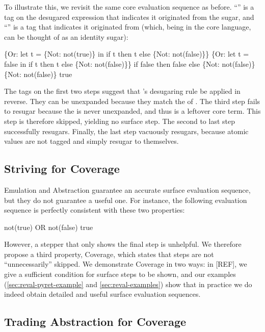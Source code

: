 To illustrate this, we revisit the same core evaluation sequence as
before. ``'' is a tag on the desugared expression that
indicates it originated from the  sugar, and ``''
is a tag that indicates it originated from  (which, being in
the core language, can be thought of as an identity sugar):
\begin{Codes}
    \{Or: let t = \{Not: not(true)\} in
      if t then t else \{Not: not(false)\}\}
\CoreStep \{Or: let t = false in
      if t then t else \{Not: not(false)\}\}
\CoreStep if false then false else \{Not: not(false)\}
\CoreStep \{Not: not(false)\}
\CoreStep true
\end{Codes}
The tags on the first two steps suggest that 's
desugaring rule be applied in reverse. They can be unexpanded
because they match the  of . The third step fails to
resugar because the  is never unexpanded, and thus is a
leftover core term. This step is therefore skipped, yielding no
surface step. The second to last step successfully resugars. Finally,
the last step vacuously resugars, because atomic values are not tagged
and simply resugar to themselves.

\subsection{Striving for Coverage}

Emulation and Abstraction guarantee an accurate
surface evaluation sequence, but they do not guarantee a useful one. For
instance, the following evaluation sequence is perfectly consistent with
these two properties:
\begin{Codes}
    not(true) OR not(false)
\SurfStep true
\end{Codes}
However, a stepper that only shows the final step is unhelpful. We therefore
propose a third property, Coverage, which states that steps
are not ``unnecessarily'' skipped. We demonstrate Coverage in two
ways: in [REF], we give a sufficient condition for surface steps to be
shown, and our examples (\cref{sec:reval-pyret-example} and
\cref{sec:reval-examples}) show that in practice we do indeed obtain
detailed and useful surface evaluation sequences.

\subsection{Trading Abstraction for Coverage}
\label{sec:reval-trading}

